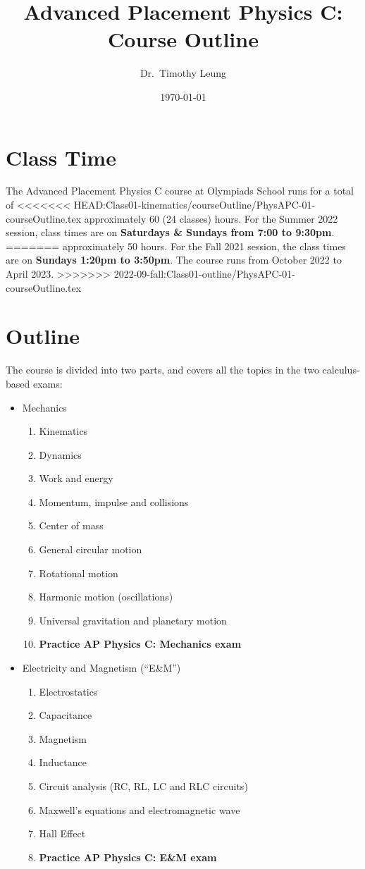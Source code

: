 \documentclass{../../oss-handout}
\title{Advanced Placement Physics C: Course Outline}
\author{Dr.\ Timothy Leung}%
\date{\today}
\begin{document}
\thispagestyle{title}
\gentitle

\section*{Class Time}
The Advanced Placement Physics C course at Olympiads School runs for a total of
<<<<<<< HEAD:Class01-kinematics/courseOutline/PhysAPC-01-courseOutline.tex
approximately 60 (24 classes) hours. For the Summer 2022 session, class times
are on \textbf{Saturdays \& Sundays from 7:00 to 9:30pm}.
=======
approximately 50 hours. For the Fall 2021 session, the class times are on
\textbf{Sundays 1:20pm to 3:50pm}. The course runs from October 2022 to April
2023.
>>>>>>> 2022-09-fall:Class01-outline/PhysAPC-01-courseOutline.tex

\section*{Outline}
The course is divided into two parts, and covers all the topics in the two
calculus-based exams:
\begin{itemize}[nosep,leftmargin=15pt]
\item Mechanics
  \begin{enumerate}[nosep]
  \item Kinematics
  \item Dynamics
  \item Work and energy
  \item Momentum, impulse and collisions
  \item Center of mass
  \item General circular motion
  \item Rotational motion
  \item Harmonic motion (oscillations)
  \item Universal gravitation and planetary motion
  \item\textbf{Practice AP Physics C: Mechanics exam}
  \end{enumerate}
\item Electricity and Magnetism (``E\&M'')
  \begin{enumerate}
  \item Electrostatics
  \item Capacitance
  \item Magnetism
  \item Inductance
  \item Circuit analysis (RC, RL, LC and RLC circuits)
  \item Maxwell's equations and electromagnetic wave
  \item Hall Effect
  \item\textbf{Practice AP Physics C: E\&M exam}
  \end{enumerate}
\end{itemize}
\end{document}
